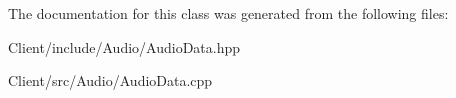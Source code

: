 The documentation for this class was generated from the following files\+:\begin{DoxyCompactItemize}
\item 
Client/include/\+Audio/Audio\+Data.\+hpp\item 
Client/src/\+Audio/Audio\+Data.\+cpp\end{DoxyCompactItemize}
